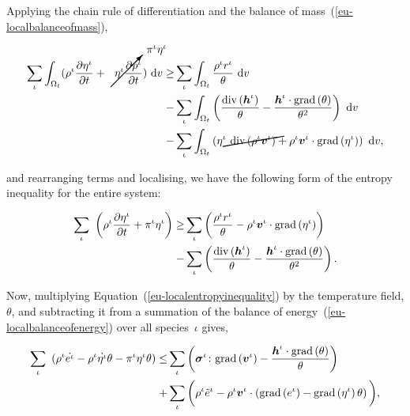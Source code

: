 \noindent Applying the chain rule of differentiation and the balance
of mass~(\ref{eu-localbalanceofmass}),

\begin{equation*}
\begin{split}
\sum\limits_{\iota} \int_{\Omega_{t}} ( \rho^{\iota} \frac{\partial
  \eta^{\iota}}{\partial t} +
\cancelto{\pi^{\iota}\eta^{\iota}}{\eta^{\iota} \frac{\partial
    \rho^{\iota}}{\partial t}}) \ \mathrm{d}v \geq &
\sum\limits_{\iota} \int_{\Omega_{t}} \frac{ \rho^{\iota}
  r^{\iota}}{\theta}\ \mathrm{d}v\\ -& \sum\limits_{\iota}
\int_{\Omega_{t}} \left(
\frac{\mathrm{div}\left(\bh^{\iota}\right)}{\theta} -
\frac{\bh^{\iota}\cdot\mathrm{grad}\left(\theta\right)}{\theta^{2}}
\right)\ \mathrm{d}v \\ - & \sum\limits_{\iota} \int_{\Omega_{t}}
\left( \cancel{\eta^{\iota}\ \mathrm{div}
  \left(\rho^{\iota}\bv^{\iota} \right)} +
\rho^{\iota}\bv^{\iota}\cdot\mathrm{grad}\left(\eta^{\iota}\right)
\right)\ \mathrm{d}v,
\end{split}
\end{equation*}

\noindent and rearranging terms and localising, we have the following
form of the entropy inequality for the entire system:

\begin{equation}
\begin{split}
\sum\limits_{\iota}\ \left( \rho^{\iota} \frac{\partial
  \eta^{\iota}}{\partial t} + \pi^{\iota}\eta^{\iota}\right) \geq &
\sum\limits_{\iota} \left( \frac{ \rho^{\iota} r^{\iota}}{\theta} -
\rho^{\iota}\mbox{\boldmath$ v$}^{\iota}\cdot\mathrm{grad}\left(\eta^{\iota}
\right)\right)\ \\ -& \sum\limits_{\iota} \left(
\frac{\mathrm{div}\left(\mbox{\boldmath$ h$}^{\iota}\right)}{\theta} -
\frac{\mbox{\boldmath$ h$}^{\iota}\cdot\mathrm{grad}\left(\theta\right)}{\theta^{2}}
\right).
\end{split}
\label{eu-localentropyinequality}
\end{equation}

Now, multiplying Equation~(\ref{eu-localentropyinequality}) by the
temperature field, $\theta$, and subtracting it from a summation of the
balance of energy~(\ref{eu-localbalanceofenergy}) over all
species~$\iota$ gives,

\begin{equation*}
\begin{split}
\sum\limits_{\iota}\ \left(\rho^{\iota} \dot{e^{\iota}} -
\rho^{\iota} \dot{\eta^{\iota}} \theta 
 - \pi^{\iota}\eta^{\iota}\theta \right) \leq &
\sum\limits_{\iota} \left(
\mbox{\boldmath$\sigma$}^{\iota}\colon\mathrm{grad}\left(\mbox{\boldmath$ v$}^{\iota}\right)
- \frac{\mbox{\boldmath$ h$}^{\iota}\cdot\mathrm{grad}\left(\theta\right)}{\theta}
\right)\ \\ +& \sum\limits_{\iota}\bigg( \rho^{\iota} \tilde{e}^{\iota} -
\rho^{\iota}\mbox{\boldmath$ v$}^{\iota} \cdot\left(
\mathrm{grad} \left(e^{\iota}\right) - \mathrm{grad}\left(\eta^{\iota}
\right)\theta\right)\bigg),
\end{split}
\end{equation*}

